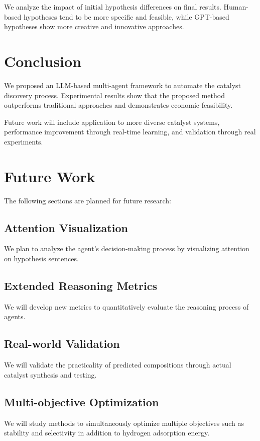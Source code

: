 We analyze the impact of initial hypothesis differences on final results. Human-based hypotheses tend to be more specific and feasible, while GPT-based hypotheses show more creative and innovative approaches.

\section{Conclusion}

We proposed an LLM-based multi-agent framework to automate the catalyst discovery process. Experimental results show that the proposed method outperforms traditional approaches and demonstrates economic feasibility.

Future work will include application to more diverse catalyst systems, performance improvement through real-time learning, and validation through real experiments.

\clearpage

\section{Future Work}

The following sections are planned for future research:

\subsection{Attention Visualization}
We plan to analyze the agent's decision-making process by visualizing attention on hypothesis sentences.

\subsection{Extended Reasoning Metrics}
We will develop new metrics to quantitatively evaluate the reasoning process of agents.

\subsection{Real-world Validation}
We will validate the practicality of predicted compositions through actual catalyst synthesis and testing.

\subsection{Multi-objective Optimization}
We will study methods to simultaneously optimize multiple objectives such as stability and selectivity in addition to hydrogen adsorption energy.




\clearpage

\listoffigures

\clearpage

\listoftables

\clearpage

\listoflistings

